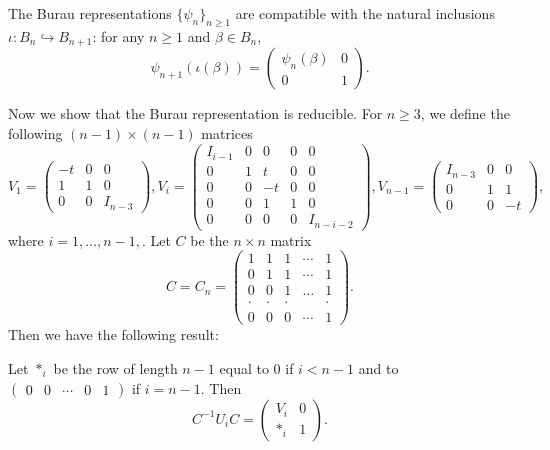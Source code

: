 The Burau representations $\{ \psi_n \}_{n\geq 1}$ are compatible with the natural inclusions $\iota : B_n \hookrightarrow B_{n+1}$: for any $n\geq 1 $ and $\beta \in B_n$, 
\begin{equation}
\label{eq:3}
\psi_{n+1}(\iota(\beta)) = \begin{pmatrix} \psi_n(\beta) & 0 \\ 0 & 1 \end{pmatrix}.
\end{equation}

Now we show that the Burau representation is reducible. For $n\geq 3$, we define the following $(n-1)\times(n-1)$ matrices 
\begin{displaymath}
  V_1 = \begin{pmatrix} -t & 0 & 0 \\ 1 & 1 & 0 \\ 0 & 0 & I_{n-3} \end{pmatrix},
  V_i = \begin{pmatrix} I_{i-1} & 0 & 0 & 0  & 0 \\ 0 & 1 & t & 0 & 0 \\ 0 & 0 & -t & 0 & 0 \\0 & 0 & 1 & 1 & 0 \\ 0 & 0 & 0 & 0 & I_{n-i-2} \end{pmatrix},
  V_{n-1} = \begin{pmatrix} I_{n-3} & 0 & 0 \\ 0 & 1 & 1 \\ 0 & 0 & -t \end{pmatrix},
\end{displaymath}
where $i = 1, \ldots, n-1,$. Let $C$ be the $n\times n$ matrix 
\begin{displaymath}
C = C_n = \begin{pmatrix} 1 & 1 & 1 & \cdots & 1 \\ 0 & 1 & 1 & \cdots &  1 \\ 0 & 0 & 1 & \dots & 1 \\ \cdot & \cdot & \cdot & & \cdot \\ 0 & 0 & 0 & \cdots & 1\end{pmatrix}.
\end{displaymath}
Then we have the following result:

\begin{theorem}
\label{sec:burau-representation}
Let $*_i$ be the row of length $n-1$ equal to $0$ if $i<n-1$ and to $\begin{pmatrix} 0 & 0 & \cdots & 0 & 1 \end{pmatrix}$ if $i = n-1$. Then 
\begin{equation}
\label{eq:6}
C^{-1} U_i C = \begin{pmatrix} V_i & 0 \\ *_i & 1 \end{pmatrix}.
\end{equation}
\end{theorem}

